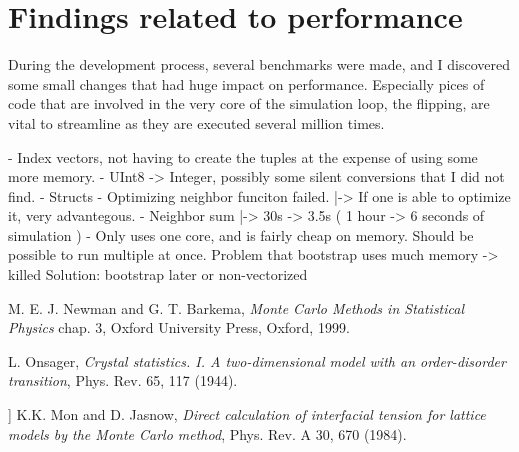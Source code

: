 \documentclass{article}
\begin{document}
\section{Findings related to performance\label{sec:performance}}
During the development process, several benchmarks were made, and I discovered some small changes that had huge impact on performance.
Especially pices of code that are involved in the very core of the simulation loop, the flipping, are vital to streamline as they are executed several million times.

- Index vectors, not having to create the tuples at the expense of using some more memory.
- UInt8 -> Integer, possibly some silent conversions that I did not find.
- Structs
- Optimizing neighbor funciton failed.
  |-> If one is able to optimize it, very advantegous.
- Neighbor sum
  |-> 30s -> 3.5s ( 1 hour -> 6 seconds of simulation )
- Only uses one core, and is fairly cheap on memory.
  Should be possible to run multiple at once.
  Problem that bootstrap uses much memory -> killed
  Solution: bootstrap later or non-vectorized


\begin{thebibliography}{9}
 M. E. J. Newman and G. T. Barkema, \emph{Monte Carlo Methods in Statistical Physics} chap. 3, Oxford University Press, Oxford, 1999.

  L. Onsager, \emph{Crystal statistics. I. A two-dimensional model with an order-disorder transition},  Phys. Rev. 65, 117 (1944).

 ]  K.K. Mon and D. Jasnow, \emph{Direct calculation of interfacial tension for lattice models by the Monte Carlo method}, Phys. Rev. A 30, 670 (1984). 
\end{thebibliography}
\end{document}
